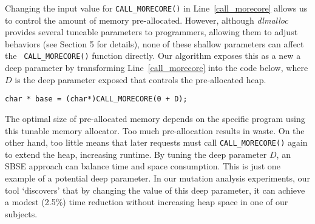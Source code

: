 Changing the input value for {\tt CALL\_MORECORE()} in Line~\ref{call_morecore} 
allows us to control the amount of memory
pre-allocated. However, although \emph{dlmalloc} provides several tuneable
parameters to programmers, allowing them to adjust behaviors (see Section 5
for details), none of these shallow parameters can affect the {\tt
CALL\_MORECORE()} function directly. Our algorithm exposes this as a new
a deep parameter by 
transforming Line~\ref{call_morecore} into
the code below, where $D$ is the deep parameter exposed that controls the
pre-allocated heap.

\begin{lstlisting}
char * base = (char*)CALL_MORECORE(0 + D);
\end{lstlisting}

The optimal size of pre-allocated memory depends on the specific program using this tunable memory allocator. Too much pre-allocation results in waste. On the other hand, too little means that later requests must call {\tt CALL\_MORECORE()} again to extend the heap, increasing runtime. By tuning the deep parameter $D$, an SBSE approach can balance time and space consumption. This is just one example of a potential deep parameter. In our mutation analysis experiments, our tool `discovers' that by changing the value of this deep parameter, it can achieve a modest (2.5\%) time reduction without increasing heap space in one of our subjects.

